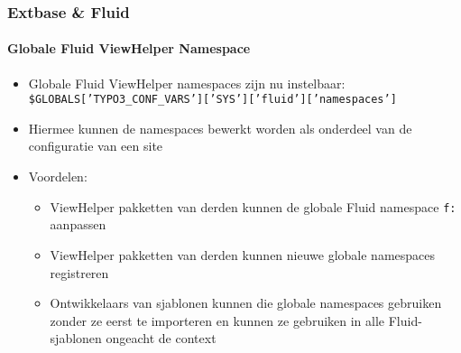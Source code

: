 \begin{frame}[fragile]
	\frametitle{Extbase \& Fluid}
	\framesubtitle{Globale Fluid ViewHelper Namespace}

	\begin{itemize}
		\item Globale Fluid ViewHelper namespaces zijn nu instelbaar:\newline
			\smaller
				\texttt{\$GLOBALS['TYPO3\_CONF\_VARS']['SYS']['fluid']['namespaces']}
			\normalsize
		\item Hiermee kunnen de namespaces bewerkt worden als onderdeel van de configuratie van een site
		\item Voordelen:

			\begin{itemize}
				\item ViewHelper pakketten van derden kunnen de globale Fluid namespace \texttt{f:} aanpassen
				\item ViewHelper pakketten van derden kunnen nieuwe globale namespaces registreren
				\item Ontwikkelaars van sjablonen kunnen die globale namespaces gebruiken zonder ze eerst te importeren
					en kunnen ze gebruiken in alle Fluid-sjablonen ongeacht de context
			\end{itemize}

	\end{itemize}

\end{frame}


